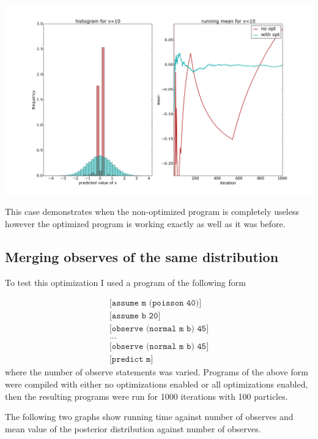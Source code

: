 \documentclass[a4paper]{article}
\begin{document}
\centerline{\includegraphics[width=16cm]{images/pushing_samples_back_2.png}}

This case demonstrates when the non-optimized program is completely useless however the optimized program is working exactly as well as it was before.




\subsection{Merging observes of the same distribution}

To test this optimization I used a program of the following form

\[
	\begin{array}{l}
		\texttt{[assume m (poisson 40)]} \\
		\texttt{[assume b 20]} \\
		\texttt{[observe (normal m b) 45]} \\
		\texttt{...} \\
		\texttt{[observe (normal m b) 45]} \\
		\texttt{[predict m]}
	\end{array}
\]
where the number of observe statements was varied. Programs of the above form were compiled with either no optimizations enabled or all optimizations enabled, then the resulting programs were run for 1000 iterations with 100 particles.

The following two graphs show running time against number of observes and mean value of the posterior distribution against number of observes.
\end{document}
